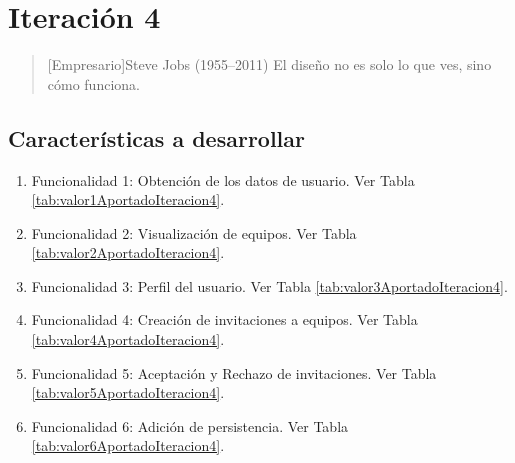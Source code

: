 \chapter{Iteración 4}

\begin{quotation}[Empresario]{Steve Jobs (1955--2011)}
El diseño no es solo lo que ves, sino cómo funciona.
\end{quotation}

\begin{abstract}
En este capítulo reflejaremos todos y cada uno de los costes que se han de reflejar a la hora de desarrollar el proyecto así como la relación de funcionalidades que se desarrollan con estos costes.
\end{abstract}

\section{Características a desarrollar}

\begin{enumerate}
\item Funcionalidad 1: Obtención de los datos de usuario. Ver Tabla \ref{tab:valor1AportadoIteracion4}.
\item Funcionalidad 2: Visualización de equipos. Ver Tabla \ref{tab:valor2AportadoIteracion4}.
\item Funcionalidad 3: Perfil del usuario. Ver Tabla \ref{tab:valor3AportadoIteracion4}.
\item Funcionalidad 4: Creación de invitaciones a equipos. Ver Tabla \ref{tab:valor4AportadoIteracion4}.
\item Funcionalidad 5: Aceptación y Rechazo de invitaciones. Ver Tabla \ref{tab:valor5AportadoIteracion4}.
\item Funcionalidad 6: Adición de persistencia. Ver Tabla \ref{tab:valor6AportadoIteracion4}.
\end{enumerate}


